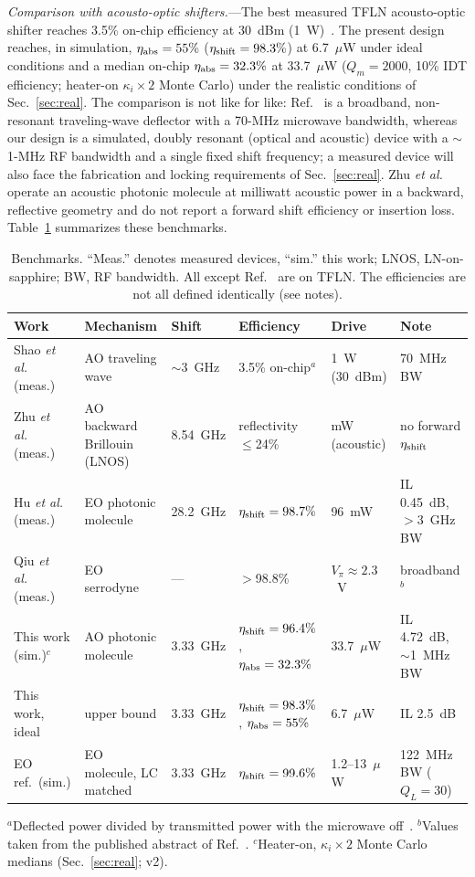 \documentclass[aps,prapplied,reprint,superscriptaddress,amsmath,amssymb,floatfix]{revtex4-2}
\newcommand{\etash}{\eta_{\rm shift}}
\newcommand{\etaabs}{\eta_{\rm abs}}
\begin{document}
\emph{Comparison with acousto-optic shifters.}---The best measured TFLN acousto-optic shifter reaches 3.5\% on-chip efficiency at 30~dBm (1~W)~\cite{Shao2020}. The present design reaches, in simulation, $\etaabs=55\%$ ($\etash=98.3\%$) at 6.7~$\mu$W under ideal conditions and a median on-chip $\etaabs=32.3\%$ at 33.7~$\mu$W ($Q_m=2000$, 10\% IDT efficiency; heater-on $\kappa_i\times2$ Monte Carlo) under the realistic conditions of Sec.~\ref{sec:real}. The comparison is not like for like: Ref.~\cite{Shao2020} is a broadband, non-resonant traveling-wave deflector with a 70-MHz microwave bandwidth, whereas our design is a simulated, doubly resonant (optical and acoustic) device with a $\sim$1-MHz RF bandwidth and a single fixed shift frequency; a measured device will also face the fabrication and locking requirements of Sec.~\ref{sec:real}. Zhu \emph{et al.}~\cite{Zhu2025ao} operate an acoustic photonic molecule at milliwatt acoustic power in a backward, reflective geometry and do not report a forward shift efficiency or insertion loss. Table~\ref{tab:sota} summarizes these benchmarks.

\begin{table}[t]
\caption{Benchmarks. ``Meas.'' denotes measured devices, ``sim.'' this work; LNOS, LN-on-sapphire; BW, RF bandwidth. All except Ref.~\cite{Zhu2025ao} are on TFLN. The efficiencies are not all defined identically (see notes).}
\label{tab:sota}
\begin{ruledtabular}
\footnotesize
\begin{tabular}{llllll}
Work & Mechanism & Shift & Efficiency & Drive & Note\\
\hline
Shao \emph{et al.}~\cite{Shao2020} (meas.) & AO traveling wave & $\sim$3~GHz & 3.5\% on-chip$^{a}$ & 1~W (30~dBm) & 70~MHz BW\\
Zhu \emph{et al.}~\cite{Zhu2025ao} (meas.) & AO backward Brillouin (LNOS) & 8.54~GHz & reflectivity $\le$24\% & mW (acoustic) & no forward $\etash$\\
Hu \emph{et al.}~\cite{Hu2021} (meas.) & EO photonic molecule & 28.2~GHz & $\etash=98.7\%$ & 96~mW & IL 0.45~dB, $>$3~GHz BW\\
Qiu \emph{et al.}~\cite{Qiu2025} (meas.) & EO serrodyne & --- & $>$98.8\% & $V_\pi\approx2.3$~V & broadband$^{b}$\\
This work (sim.)$^{c}$ & AO photonic molecule & 3.33~GHz & $\etash=96.4\%$, $\etaabs=32.3\%$ & 33.7~$\mu$W & IL 4.72~dB, $\sim$1~MHz BW\\
This work, ideal & upper bound & 3.33~GHz & $\etash=98.3\%$, $\etaabs=55\%$ & 6.7~$\mu$W & IL 2.5~dB\\
EO ref.\ (sim.) & EO molecule, LC matched & 3.33~GHz & $\etash=99.6\%$ & 1.2--13~$\mu$W & 122~MHz BW ($Q_L=30$)\\
\end{tabular}
\end{ruledtabular}
\raggedright\footnotesize $^{a}$Deflected power divided by transmitted power with the microwave off~\cite{Shao2020}. $^{b}$Values taken from the published abstract of Ref.~\cite{Qiu2025}. $^{c}$Heater-on, $\kappa_i\times2$ Monte Carlo medians (Sec.~\ref{sec:real}; v2).
\end{table}
\end{document}
